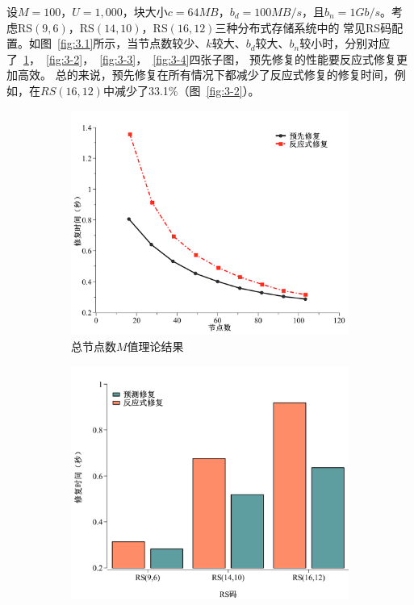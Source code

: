 设$M=100$，$U=1,000$，块大小$c=64MB$，$b_d=100MB/s$，且$b_n=1Gb/s$。考虑RS$(9,6)$，RS$(14,10)$，RS$(16,12)$三种分布式存储系统中的
常见RS码配置。如图~\ref{fig:3.1}所示，当节点数较少、$k$较大、$b_d$较大、$b_n$较小时，分别对应了~\ref{fig:3-1}，~\ref{fig:3-2}，~\ref{fig:3-3}，~\ref{fig:3-4}四张子图，
预先修复的性能要反应式修复更加高效。
总的来说，预先修复在所有情况下都减少了反应式修复的修复时间，例如，在$RS(16, 12)$中减少了33.1\%（图~\ref{fig:3-2}）。


\begin{figure}[htbp]
	\centering
	\begin{subfigure}[t]{0.4\textwidth}
		\centering
		\includegraphics[width=1.1\linewidth]{figures/3-1.pdf}
		\caption{总节点数$M$值理论结果}
		\label{fig:3-1}
	\end{subfigure}
	\begin{subfigure}[t]{0.4\textwidth}
		\centering
		\includegraphics[width=1.2\linewidth]{figures/3-2.pdf}

\end{subfigure}
\end{figure}
